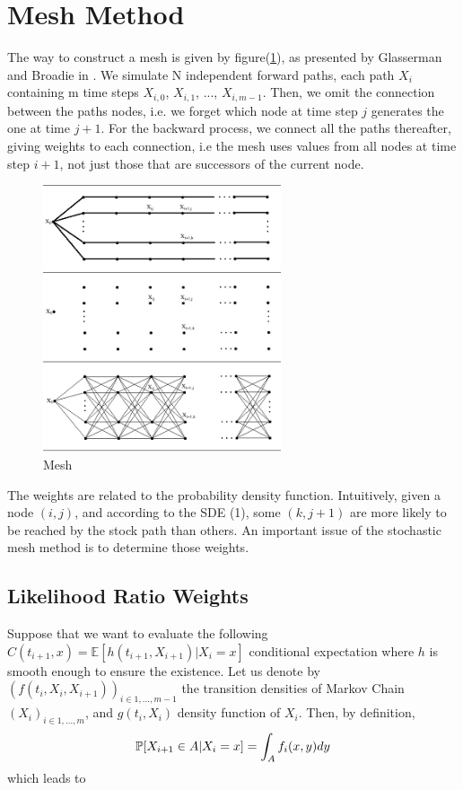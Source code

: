 \documentclass[english,11pt,openany]{report}
\theoremstyle{definition}
\theoremstyle{plain}
\theoremstyle{definition}
\begin{document}
\section{Mesh Method}

The way to construct a mesh is given by figure(\ref{fig:mesh}), as presented by Glasserman and Broadie in \cite{broadie2004stochastic} . We simulate N independent forward paths, each path $X_i$ containing m time steps $X_{i,0}$, $X_{i,1}$, ..., $X_{i,m-1}$. Then, we omit the connection between the paths nodes, i.e. we forget which node at time step $j$ generates the one at time $j+1$. 
For the backward process, we connect all the paths thereafter, giving weights to each connection, i.e the mesh uses values from all nodes at time step $i + 1$, not just those that are successors of the current node.


\begin{figure}[H]
	\begin{center}
		
		\includegraphics[width=7cm]{mesh_figure.png} 
		\caption{Mesh \label{fig:mesh}}
	\end{center}
\end{figure}


The weights are related to the probability density function. Intuitively, given a node $(i,j)$, and according to the SDE (1), some $(k,j+1)$ are more likely to be reached by the stock path than others. An important issue of the stochastic mesh method is to determine those weights. 

\subsection{Likelihood Ratio Weights}

Suppose that we want to evaluate the following $C(t_{i+1}, x) = \mathbb{E}[h(t_{i+1},X_{i+1})| X_i = x]$ conditional expectation where $h$ is smooth enough to ensure the existence. 
Let us denote by $(f(t_i, X_i, X_{i+1}))_{i \in {1, ..., m-1}}$ the transition densities of Markov Chain $(X_i)_{i \in {1, ..., m}}$, and $g\left(t_i, X_i\right)$ density function of $X_i$. 
Then, by definition, 
\begin{equation}
\mathbb{P}[X_{i+1} \in A|X_i=x] = \int_{A}^{}f_i(x, y)dy  \notag
\end{equation}
which leads to
\end{document}
